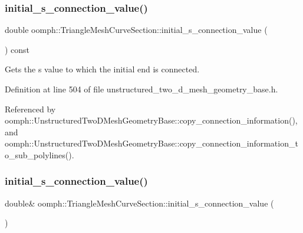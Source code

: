 \subsubsection{\texorpdfstring{initial\+\_\+s\+\_\+connection\+\_\+value()}{initial\_s\_connection\_value()}\hspace{0.1cm}{\footnotesize\ttfamily [1/2]}}
{\footnotesize\ttfamily double oomph\+::\+Triangle\+Mesh\+Curve\+Section\+::initial\+\_\+s\+\_\+connection\+\_\+value (\begin{DoxyParamCaption}{ }\end{DoxyParamCaption}) const\hspace{0.3cm}{\ttfamily [inline]}}



Gets the s value to which the initial end is connected. 



Definition at line 504 of file unstructured\+\_\+two\+\_\+d\+\_\+mesh\+\_\+geometry\+\_\+base.\+h.



Referenced by oomph\+::\+Unstructured\+Two\+D\+Mesh\+Geometry\+Base\+::copy\+\_\+connection\+\_\+information(), and oomph\+::\+Unstructured\+Two\+D\+Mesh\+Geometry\+Base\+::copy\+\_\+connection\+\_\+information\+\_\+to\+\_\+sub\+\_\+polylines().

\mbox{\label{classoomph_1_1TriangleMeshCurveSection_a80b972314a676c61e4fe5ed7fed005c8}} 
\subsubsection{\texorpdfstring{initial\+\_\+s\+\_\+connection\+\_\+value()}{initial\_s\_connection\_value()}\hspace{0.1cm}{\footnotesize\ttfamily [2/2]}}
{\footnotesize\ttfamily double\& oomph\+::\+Triangle\+Mesh\+Curve\+Section\+::initial\+\_\+s\+\_\+connection\+\_\+value (\begin{DoxyParamCaption}{ }\end{DoxyParamCaption})\hspace{0.3cm}{\ttfamily [inline]}}



